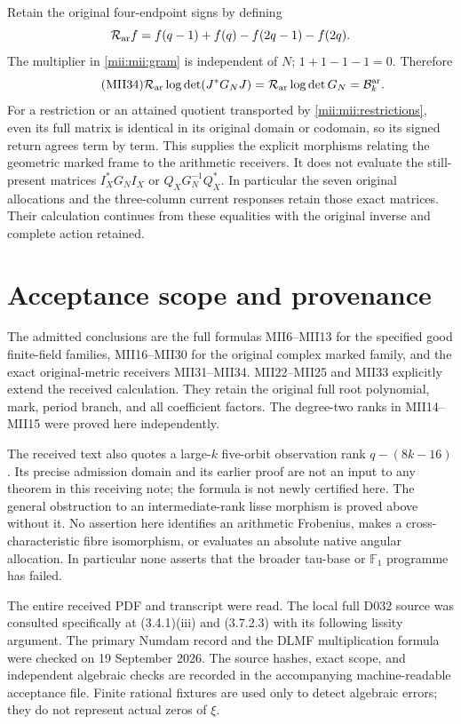 \documentclass[11pt,a4paper]{article}
\begin{document}
Retain the original four-endpoint signs by defining
\[
 \mathcal R_{\rm ar}f=f(q-1)+f(q)-f(2q-1)-f(2q).
\]
The multiplier in \eqref{mii:mii:gram} is independent of $N$;
$1+1-1-1=0$. Therefore
\begin{equation}\tag{MII34}\label{mii:mii:return}
 \mathcal R_{\rm ar}\log\det(J^*G_NJ)
    =\mathcal R_{\rm ar}\log\det G_N
    =\mathcal B_k^{\rm ar}.
\end{equation}
For a restriction or an attained quotient transported by
\eqref{mii:mii:restrictions}, even its full matrix is identical in its
original domain or codomain, so its signed return agrees term by
term. This supplies the explicit morphisms relating the geometric
marked frame to the arithmetic receivers. It does not evaluate
the still-present matrices $I_X^*G_NI_X$ or $Q_XG_N^{-1}Q_X^*$.
In particular the seven original allocations and the three-column
current responses retain those exact matrices. Their calculation
continues from these equalities with the original inverse and
complete action retained.

\section{Acceptance scope and provenance}
The admitted conclusions are the full formulas MII6--MII13 for
the specified good finite-field families, MII16--MII30 for the
original complex marked family, and the exact original-metric
receivers MII31--MII34. MII22--MII25 and MII33 explicitly extend
the received calculation. They retain the original full root
polynomial, mark, period branch, and all coefficient factors.
The degree-two ranks in MII14--MII15 were proved here independently.

The received text also quotes a large-$k$ five-orbit observation
rank $q-(8k-16)$. Its precise admission domain and its earlier
proof are not an input to any theorem in this receiving note;
the formula is not newly certified here. The general obstruction
to an intermediate-rank lisse morphism is proved above without it.
No assertion here identifies an arithmetic Frobenius, makes a
cross-characteristic fibre isomorphism, or evaluates an absolute
native angular allocation. In particular none asserts that the
broader tau-base or $\mathbb F_1$ programme has failed.

The entire received PDF and transcript were read. The local full
D032 source was consulted specifically at (3.4.1)(iii) and
(3.7.2.3) with its following lissity argument. The primary Numdam
record and the DLMF multiplication formula were checked on
19 September 2026. The source hashes, exact scope, and independent
algebraic checks are recorded in the accompanying machine-readable
acceptance file. Finite rational fixtures are used only to detect
algebraic errors; they do not represent actual zeros of $\xi$.
\end{document}
